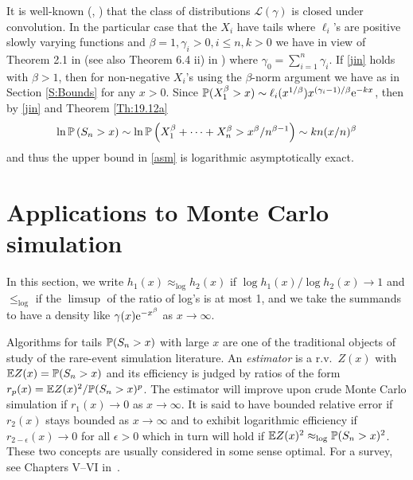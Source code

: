 	It is well-known (\cite{Cline}, \cite{Wata}) that the class of distributions  $\mathcal{L}(\gamma)$ is closed under convolution.  In the particular case that the $X_i$ have tails
	where $\ell_i$'s are  positive slowly varying functions and $\beta=1, \gamma_i>0, i\le n,k>0$ we have in view of
	Theorem 2.1 in \cite{EHJL} (see also Theorem 6.4 ii) in \cite{adler2017relative})
	where $\gamma_0=\sum_{i=1}^n \gamma_i$.
	If \eqref{jin} holds with $\beta>1$, then for non-negative $X_i$'s using the $\beta$-norm argument we have as in Section \ref{S:Bounds}
	for any $x>0$. Since $\mathbb{P}( X_1^{\beta}> x) \sim \ell_i(x^{1/\beta}) x^{(\gamma_i- 1)/\beta} \mathrm{e}^{- k x}$, then by \eqref{jin} and Theorem \ref{Th:19.12a}
	$$\ln \mathbb{P} \left( S_n> x \right) \sim   \ln  \mathbb{P} \left(  X_1^{\beta}+ \cdots +X_n^{\beta} > x^\beta /n^{\beta-1} \right)  \sim  k n (x/n)^{\beta}  $$
and thus the upper bound in \eqref{asm} is logarithmic asymptotically exact.

\section{Applications to Monte Carlo simulation}\label{S:CdMC}

In this section, we write $h_1(x)\approx_{\log}h_2(x)$ if $\log h_1(x)/\log h_2(x)\to 1$
and $ \le_{\log}$ if the $\limsup$ of the ratio of log's is at most 1, and we take the summands 
to have a density like $\gamma(x) \mathrm{e}^{-x^\beta}$ as $x \to \infty$.  

Algorithms for tails $\mathbb{P}(S_n > x)$ with large $x$ are one of the traditional objects
of study of the rare-event simulation literature.  
An \emph{estimator} is a r.v.\ $Z(x)$ with $\mathbb{E} Z(x)=\mathbb{P}(S_n > x)$ and its efficiency
is judged by ratios of the form $r_p(x)=\mathbb{E} Z(x)^2/\mathbb{P}(S_n > x)^p$. The
estimator will improve upon crude Monte Carlo simulation if $r_1(x)\to 0$ as $x\to\infty$. It is said to have bounded relative error if $r_2(x) $ stays bounded as $x\to\infty$ and to
exhibit logarithmic efficiency if $r_{2-\epsilon}(x)\to 0$ for all $\epsilon>0$ which in turn
will hold if $\mathbb{E} Z(x)^2\approx_{\log} \mathbb{P}(S_n > x)^2$. These two concepts are
usually considered in some sense optimal. For a survey, see Chapters 
V--VI in~\cite{asmussen2007stochastic}.

